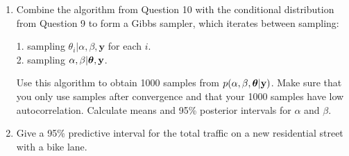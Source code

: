 \documentclass[12pt]{article}
\def\y{\mathbf{y}}
\newcommand{\bth}{\mbox{\boldmath $\theta$}}
\begin{document}
\begin{enumerate}
	\item Combine the algorithm from Question 10 with the conditional distribution from Question 9 to form a Gibbs sampler, which iterates between sampling:
	
	1. sampling $\theta_i | \alpha,\beta,\y$ for each $i$.\\
	2. sampling $\alpha,\beta|\bth,\y$.
	
	Use this algorithm to obtain 1000 samples from $p(\alpha,\beta,\bth|\y)$. Make sure that you only use samples after convergence and that your 1000 samples have low autocorrelation. Calculate means and 95\% posterior intervals for $\alpha$ and $\beta$.
	
	\item Give a 95\% predictive interval for the total traffic on a new residential street with a bike lane. 
\end{enumerate}
\end{document}
